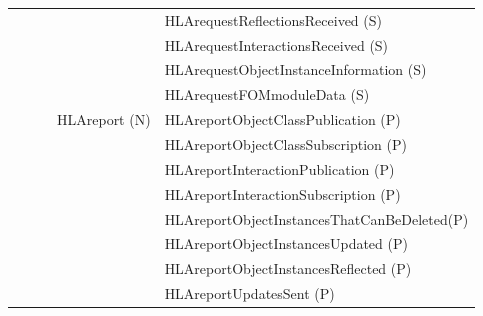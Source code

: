 \begin{compactstdpage}
\begin{momtabletypeset}[8.00]
{{\begin{tabular}{|Y{76.87pt}|Y{60.44pt}|Y{67.64pt}|Y{54.56pt}|Y{156.97pt}|}
                    &                &                 &                        & HLArequestReflectionsReceived (S)                     \\
                    &                &                 &                        & HLArequestInteractionsReceived (S)                    \\
                    &                &                 &                        & HLArequestObjectInstanceInformation (S)               \\
                    &                &                 &                        & HLArequestFOMmoduleData (S)                           \\
                    &                &                 & HLAreport (N)          & HLAreportObjectClassPublication (P)                   \\
                    &                &                 &                        & HLAreportObjectClassSubscription (P)                  \\
                    &                &                 &                        & HLAreportInteractionPublication (P)                   \\
                    &                &                 &                        & HLAreportInteractionSubscription (P)                  \\
                    &                &                 &                        & HLAreportObjectInstancesThatCanBeDeleted\newline (P)  \\
                    &                &                 &                        & HLAreportObjectInstancesUpdated (P)                   \\
                    &                &                 &                        & HLAreportObjectInstancesReflected (P)                 \\
                    &                &                 &                        & HLAreportUpdatesSent (P)                              \\

\end{tabular}}}
\end{momtabletypeset}
\end{compactstdpage}

